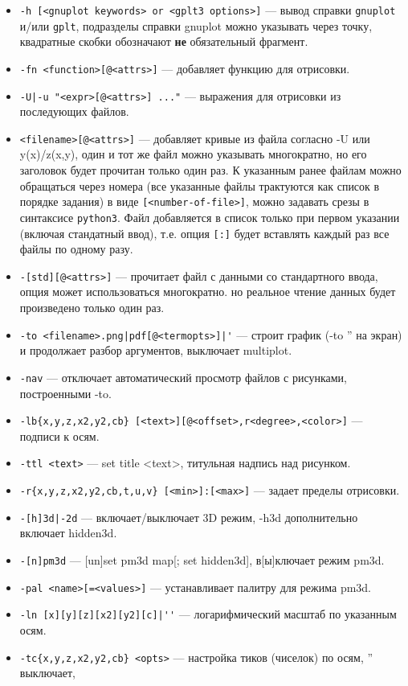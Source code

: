 \documentclass[12pt]{article}
\def\gplt{{\tt gplt}}
\def\gnuplot{{\tt gnuplot}}
\def\python{{\tt python3}}
\begin{document}
\begin{itemize}
\item \verb'-h [<gnuplot keywords> or <gplt3 options>]' --- вывод справки \gnuplot{} и/или \gplt, 
  подразделы справки gnuplot можно указывать через точку, квадратные скобки обозначают {\bf не} обязательный фрагмент.
\item \verb'-fn <function>[@<attrs>]' --- добавляет функцию для отрисовки.
\item \verb'-U|-u "<expr>[@<attrs>] ..."' --- выражения для отрисовки из последующих файлов.
\item \verb'<filename>[@<attrs>]' --- добавляет кривые из файла согласно -U или y(x)/z(x,y), один и тот же файл можно
  указывать многократно, но его заголовок будет прочитан только один раз. К указанным ранее файлам можно обращаться
  через номера (все указанные файлы трактуются как список в порядке задания) в виде \verb'[<number-of-file>]', можно задавать
  срезы в синтаксисе \python. Файл добавляется в список только при первом указании (включая стандатный ввод), т.е. опция \verb'[:]' будет
  вставлять каждый раз все файлы по одному разу.
\item \verb'-[std][@<attrs>]' --- прочитает файл с данными со стандартного ввода, опция может использоваться многократно. но реальное чтение данных
  будет произведено только один раз. 
\item \verb:-to <filename>.png|pdf[@<termopts>]|': --- строит график (-to '' на экран)
    и продолжает разбор аргументов, выключает multiplot. 
\item \verb'-nav' --- отключает автоматический просмотр файлов с рисунками, построенными -to.                     
\item \verb'-lb{x,y,z,x2,y2,cb} [<text>][@<offset>,r<degree>,<color>]' --- подписи к осям.
\item \verb'-ttl <text>' --- set title <text>, титульная надпись над рисунком.
\item \verb'-r{x,y,z,x2,y2,cb,t,u,v} [<min>]:[<max>]' --- задает пределы отрисовки.
\item \verb'-[h]3d|-2d' --- включает/выключает 3D режим, -h3d дополнительно включает hidden3d.
\item \verb'-[n]pm3d' --- [un]set pm3d map[; set hidden3d], в[ы]ключает режим pm3d.
\item \verb'-pal <name>[=<values>]' --- устанавливает палитру для режима pm3d.
\item \verb:-ln [x][y][z][x2][y2][c]|'': --- логарифмический масштаб по указанным осям.
\item \verb'-tc{x,y,z,x2,y2,cb} <opts>'  --- настройка тиков (чиселок) по осям, '' выключает,

\end{itemize}
\end{document}
